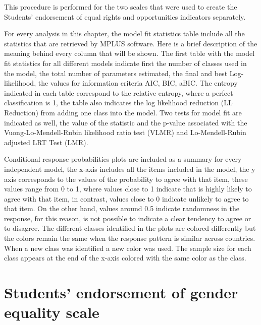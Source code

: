\documentclass[12pt,a4paper,oneside]{reedthesis}
\begin{document}
This procedure is performed for the two scales that were used to create the Students' endorsement of equal rights and opportunities indicators separately.

For every analysis in this chapter, the model fit statistics table include all the statistics that are retrieved by MPLUS software. Here is a brief description of the meaning behind every column that will be shown. The first table with the model fit statistics for all different models indicate first the number of classes used in the model, the total number of parameters estimated, the final and best Log-likelihood, the values for information criteria AIC, BIC, aBIC. The entropy indicated in each table correspond to the relative entropy, where a perfect classification is 1, the table also indicates the log likelihood reduction (LL Reduction) from adding one class into the model. Two tests for model fit are indicated as well, the value of the statistic and the p-value associated with the Vuong-Lo-Mendell-Rubin likelihood ratio test (VLMR) and Lo-Mendell-Rubin adjusted LRT Test (LMR).

Conditional response probabilities plots are included as a summary for every independent model, the x-axis includes all the items included in the model, the y axis corresponds to the values of the probability to agree with that item, these values range from 0 to 1, where values close to 1 indicate that is highly likely to agree with that item, in contrast, values close to 0 indicate unlikely to agree to that item. On the other hand, values around 0.5 indicate randomness in the response, for this reason, is not possible to indicate a clear tendency to agree or to disagree. The different classes identified in the plots are colored differently but the colors remain the same when the response pattern is similar across countries. When a new class was identified a new color was used. The sample size for each class appears at the end of the x-axis colored with the same color as the class.

\hypertarget{students-endorsement-of-gender-equality-scale}{%
\section{Students' endorsement of gender equality scale}\label{students-endorsement-of-gender-equality-scale}}
\end{document}
